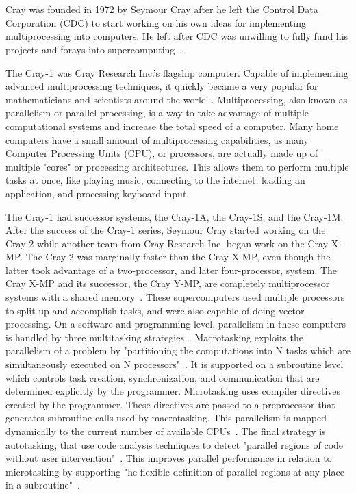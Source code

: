 \documentclass[12pt, letterpaper]{article}
\begin{document}
\section{}
	Cray was founded in 1972 by Seymour Cray after he left the Control Data Corporation (CDC) to start working on his own ideas for implementing multiprocessing into computers. He left after CDC was unwilling to fully fund his projects and forays into supercomputing~\cite{bio}.
	
	The Cray-1 was Cray Research Inc.'s flagship computer. Capable of implementing advanced multiprocessing techniques, it quickly became a very popular for mathematicians and scientists around the world~\cite{glowinski}. Multiprocessing, also known as parallelism or parallel processing, is a way to take advantage of multiple computational systems and increase the total speed of a computer. Many home computers have a small amount of multiprocessing capabilities, as many Computer Processing Units (CPU), or processors, are actually made up of multiple "cores" or processing architectures. This allows them to perform multiple tasks at once, like playing music, connecting to the internet, loading an application, and processing keyboard input.
	
	The Cray-1 had successor systems, the Cray-1A, the Cray-1S, and the Cray-1M. After the success of the Cray-1 series, Seymour Cray started working on the Cray-2 while another team from Cray Research Inc. began work on the Cray X-MP. The Cray-2 was marginally faster than the Cray X-MP, even though the latter took advantage of a two-processor, and later four-processor, system. The Cray X-MP and its successor, the Cray Y-MP, are completely multiprocessor systems with a shared memory~\cite{glowinski}. These supercomputers used multiple processors to split up and accomplish tasks, and were also capable of doing vector processing. On a software and programming level, parallelism in these computers is handled by three multitasking strategies~\cite{glowinski}. Macrotasking exploits the parallelism of a problem by "partitioning the computations into N tasks which are simultaneously executed on N processors"~\cite{glowinski}. It is supported on a subroutine level which controls task creation, synchronization, and communication that are determined explicitly by the programmer. Microtasking uses compiler directives created by the programmer. These directives are passed to a preprocessor that generates subroutine calls used by macrotasking. This parallelism is mapped dynamically to the current number of available CPUs~\cite{glowinski}. The final strategy is autotasking, that use code analysis techniques to detect "parallel regions of code without user intervention"~\cite{glowinski}. This improves parallel performance in relation to microtasking by supporting "he flexible definition of parallel regions at any place in a subroutine"~\cite{glowinski}.
	
\end{document}
